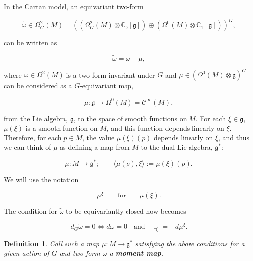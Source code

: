 \documentclass{article}
\newtheorem{defn}[theorem]{Definition\rm}
\newcommand{\lra}{\longrightarrow}
\newcommand{\w}{\omega}
\newcommand{\W}{\Omega}
\newcommand{\CC}{\mathbb{C}}
\newcommand{\mfg}{\mathfrak{g}}
\newcommand{\mc}[1]{\mathcal{#1}}
\begin{document}
\newpage

In the Cartan model, an equivariant two-form

	\begin{equation*}
		\tilde{\w} \in \W_{G}^{2}(M) = \left( \left( \W_{G}^{2}(M) \otimes \CC_{0}[\mfg] \right) \oplus \left( \W^{0}(M) \otimes \CC_{1}[\mfg] \right) \right)^{G},
	\end{equation*} 

can be written as

	\begin{equation*}
		\tilde{\w} = \w - \mu,
	\end{equation*}

where $\w \in \W^{2}(M)$ is a two-form invariant under $G$ and $\mu \in \left( \W^{0}(M) \otimes \mfg \right)^{G}$ can be considered as a $G$-equivariant map,

	\begin{equation*}
		\mu : \mfg \lra \W^{0}(M) = \mc{C}^{\infty}(M),
	\end{equation*}

from the Lie algebra, $\mfg$, to the space of smooth functions on $M$. For each $\xi \in \mfg$, $\mu(\xi)$ is a smooth function on $M$, and this function depends linearly on $\xi$. Therefore, for each $p \in M$, the value $\mu(\xi)(p)$ depends linearly on $\xi$, and thus we can think of $\mu$ as defining a map from $M$ to the dual Lie algebra, $\mfg^{\ast}$:

	\begin{equation*}
		\mu : M \lra \mfg^{\ast}; \qquad \langle \mu(p), \xi \rangle := \mu(\xi)(p).
	\end{equation*}

We will use the notation

\begin{equation*}
	\mu^{\xi} \qquad \text{for} \qquad \mu(\xi).
\end{equation*}

The condition for $\tilde{\w}$ to be equivariantly closed now becomes

\begin{equation*}
	d_{G}\tilde{\w} = 0 \iff  d\w = 0 \quad \text{and} \quad \imath_{\xi} = -d\mu^{\xi}.
\end{equation*}

\begin{defn}
	Call such a map $\mu : M \lra \mfg^{\ast}$ satisfying the above conditions for a given action of $G$ and two-form $\w$ a \textbf{moment map}.
\end{defn}
\end{document}
